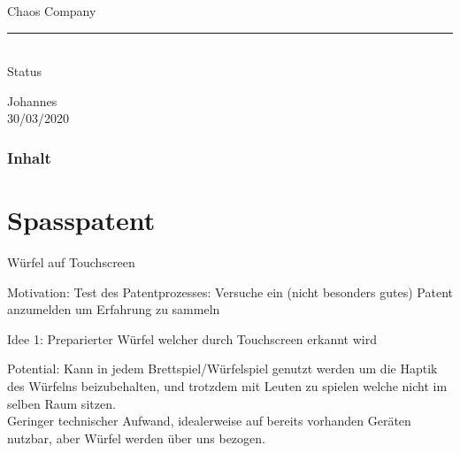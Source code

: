 \documentclass{beamer}
\begin{document}
{
\begin{frame}
	\vspace{0.7cm}
	\begin{mdframed}[tikzsetting={draw=lkb,fill=white,fill opacity=0.7, line width=4}, backgroundcolor=none, 							   leftmargin=0, rightmargin=0, innertopmargin=10]
		\vspace{0.5cm}
		{\Large{
  		\begin{center}Chaos Company\\[0.25cm]
                      \rule{5cm}{0.1cm}\\[0.25cm]
                      Status
        \end{center}
		}}
  		\vspace{0.75cm}
  		\centering
  		{\small{
  		\hspace{1cm} Johannes \hspace{1cm}\phantom{}\\
  		\phantom{}\hspace{1cm} 30/03/2020 \hspace{1cm}\phantom{}\\
  		}}
	\end{mdframed}

\end{frame}
}

\begin{frame}
\frametitle{Inhalt}
\tableofcontents[]
\end{frame}

\section{Spasspatent}

\begin{frame}{W\"urfel auf Touchscreen}



\begin{block}{Motivation:}
Test des Patentprozesses: Versuche ein (nicht besonders gutes) Patent anzumelden um Erfahrung zu sammeln
\end{block}


\begin{exampleblock}{Idee 1:}
Preparierter W\"urfel welcher durch Touchscreen erkannt wird
\end{exampleblock}

\begin{alertblock}{Potential:}
Kann in jedem Brettspiel/W\"urfelspiel genutzt werden um die Haptik des W\"urfelns beizubehalten, und trotzdem mit Leuten zu spielen welche nicht im selben Raum sitzen.\\
Geringer technischer Aufwand, idealerweise auf bereits vorhanden Ger\"aten nutzbar, aber W\"urfel werden \"uber uns bezogen.
\end{alertblock}

\end{frame}
\end{document}
